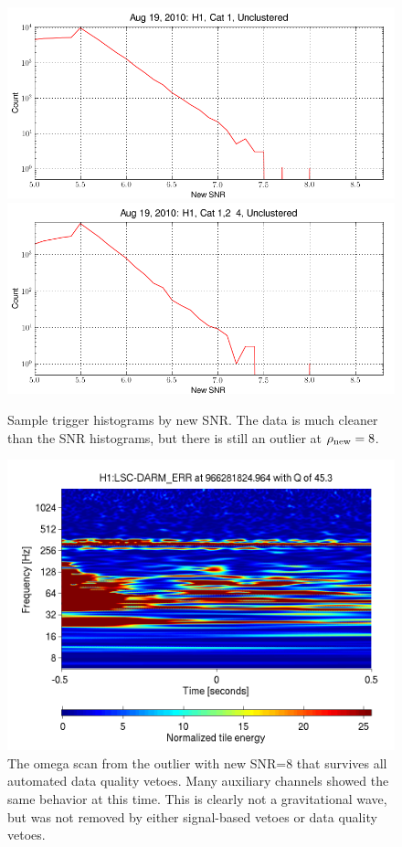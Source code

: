 \begin{figure}
  \includegraphics[width=0.5\linewidth]{figures/detchar/H1_1_UNCLUSTERED_new_snr_hist.png}
  \includegraphics[width=0.5\linewidth]{figures/detchar/H1_4_UNCLUSTERED_new_snr_hist.png}
  \caption[Trigger new SNR histograms for H1]{
  \label{f:daily_ihope_gaussianity_newsnr}
Sample trigger histograms by new SNR. The data is much cleaner than
the SNR histograms, but there is still an outlier at $\rho_{\textrm{new}}=8$.}
\end{figure}%



\begin{figure}
  \includegraphics[width=\linewidth]{figures/detchar/966281824_963867187_H1_LSC-DARM_ERR_1_00_spectrogram_whitened}
  \caption[Omega scan of the loudest new SNR trigger]{
  \label{f:daily_loudest_glitch}
The omega scan from the outlier with new SNR=8 that survives all
automated data quality vetoes.  Many auxiliary channels showed the
same behavior at this time.  This is clearly not a gravitational wave,
but was not removed by either signal-based vetoes or data quality
vetoes.}
\end{figure}%


